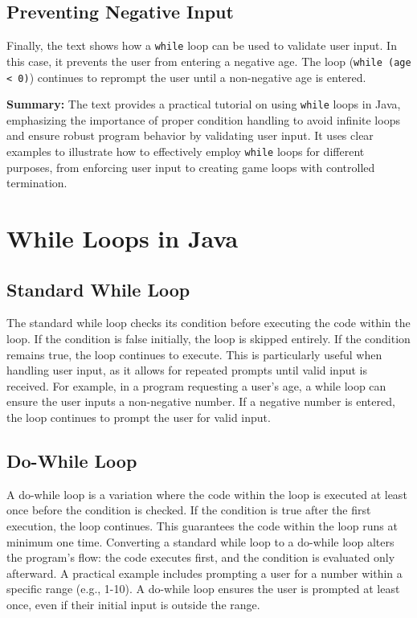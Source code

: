 \documentclass{article}
\begin{document}
\subsection{Preventing Negative Input}

Finally, the text shows how a \texttt{while} loop can be used to validate user input. In this case, it prevents the user from entering a negative age.  The loop (\texttt{while (age < 0)}) continues to reprompt the user until a non-negative age is entered.


\textbf{Summary:} The text provides a practical tutorial on using \texttt{while} loops in Java, emphasizing the importance of proper condition handling to avoid infinite loops and ensure robust program behavior by validating user input.  It uses clear examples to illustrate how to effectively employ \texttt{while} loops for different purposes, from enforcing user input to creating game loops with controlled termination.


\section{While Loops in Java}

\subsection{Standard While Loop}

The standard while loop checks its condition before executing the code within the loop.  If the condition is false initially, the loop is skipped entirely.  If the condition remains true, the loop continues to execute.  This is particularly useful when handling user input, as it allows for repeated prompts until valid input is received.  For example, in a program requesting a user's age, a while loop can ensure the user inputs a non-negative number.  If a negative number is entered, the loop continues to prompt the user for valid input.


\subsection{Do-While Loop}

A do-while loop is a variation where the code within the loop is executed at least once before the condition is checked.  If the condition is true after the first execution, the loop continues.  This guarantees the code within the loop runs at minimum one time.  Converting a standard while loop to a do-while loop alters the program's flow: the code executes first, and the condition is evaluated only afterward.  A practical example includes prompting a user for a number within a specific range (e.g., 1-10).  A do-while loop ensures the user is prompted at least once, even if their initial input is outside the range.
\end{document}
